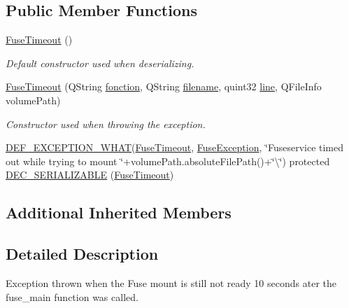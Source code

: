 \subsection*{Public Member Functions}
\begin{DoxyCompactItemize}
\item 
\hyperlink{class_gost_crypt_1_1_fuse_driver_1_1_fuse_timeout_a8737b181f30645a5ecd707cc056d6a58}{Fuse\+Timeout} ()
\begin{DoxyCompactList}\small\item\em Default constructor used when deserializing. \end{DoxyCompactList}\item 
\hyperlink{class_gost_crypt_1_1_fuse_driver_1_1_fuse_timeout_a4f8c14534fc9ef602973b725f2e0652f}{Fuse\+Timeout} (Q\+String \hyperlink{class_gost_crypt_1_1_gost_crypt_exception_a29b8c93d5efbb1ff369107385725a939}{fonction}, Q\+String \hyperlink{class_gost_crypt_1_1_gost_crypt_exception_a749a12375f4ba9d502623b99d8252f38}{filename}, quint32 \hyperlink{class_gost_crypt_1_1_gost_crypt_exception_abf506d911f12a4e969eea500f90bd32c}{line}, Q\+File\+Info volume\+Path)
\begin{DoxyCompactList}\small\item\em Constructor used when throwing the exception. \end{DoxyCompactList}\item 
\hyperlink{_gost_crypt_exception_8h_a5bc1e1c6c9d6f46c84eeba49e33355f9}{D\+E\+F\+\_\+\+E\+X\+C\+E\+P\+T\+I\+O\+N\+\_\+\+W\+H\+AT}(\hyperlink{class_gost_crypt_1_1_fuse_driver_1_1_fuse_timeout}{Fuse\+Timeout}, \hyperlink{class_gost_crypt_1_1_fuse_driver_1_1_fuse_exception}{Fuse\+Exception}, \char`\"{}Fuseservice timed out while trying to mount \char`\"{}+volume\+Path.\+absolute\+File\+Path()+\char`\"{}\textbackslash{}\char`\"{}) protected \hyperlink{class_gost_crypt_1_1_fuse_driver_1_1_fuse_timeout_aa84f3b442794725feb09014d0378142e}{D\+E\+C\+\_\+\+S\+E\+R\+I\+A\+L\+I\+Z\+A\+B\+LE} (\hyperlink{class_gost_crypt_1_1_fuse_driver_1_1_fuse_timeout}{Fuse\+Timeout})
\end{DoxyCompactItemize}
\subsection*{Additional Inherited Members}


\subsection{Detailed Description}
Exception thrown when the Fuse mount is still not ready 10 seconds ater the fuse\+\_\+main function was called. 


